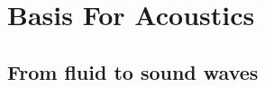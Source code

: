 \documentclass[../../main.tex]{subfiles}
\begin{document}
\section{Basis For Acoustics}


\subsection{From fluid to sound waves}

\end{document}
